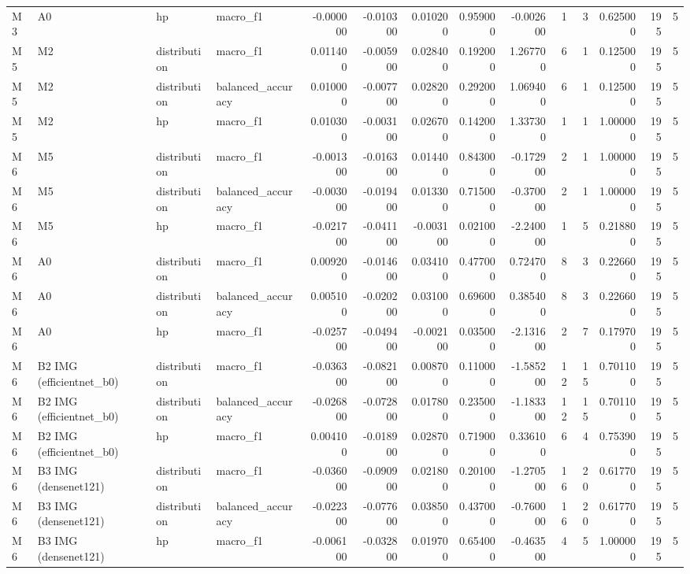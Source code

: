 \begin{table}
\begin{tabular}{llllrrrrrrrrrr}
M3 & A0 & hp & macro\_f1 & -0.000000 & -0.010300 & 0.010200 & 0.959000 & -0.002600 & 1 & 3 & 0.625000 & 195 & 5 \\
M5 & M2 & distribution & macro\_f1 & 0.011400 & -0.005900 & 0.028400 & 0.192000 & 1.267700 & 6 & 1 & 0.125000 & 195 & 5 \\
M5 & M2 & distribution & balanced\_accuracy & 0.010000 & -0.007700 & 0.028200 & 0.292000 & 1.069400 & 6 & 1 & 0.125000 & 195 & 5 \\
M5 & M2 & hp & macro\_f1 & 0.010300 & -0.003100 & 0.026700 & 0.142000 & 1.337300 & 1 & 1 & 1.000000 & 195 & 5 \\
M6 & M5 & distribution & macro\_f1 & -0.001300 & -0.016300 & 0.014400 & 0.843000 & -0.172900 & 2 & 1 & 1.000000 & 195 & 5 \\
M6 & M5 & distribution & balanced\_accuracy & -0.003000 & -0.019400 & 0.013300 & 0.715000 & -0.370000 & 2 & 1 & 1.000000 & 195 & 5 \\
M6 & M5 & hp & macro\_f1 & -0.021700 & -0.041100 & -0.003100 & 0.021000 & -2.240000 & 1 & 5 & 0.218800 & 195 & 5 \\
M6 & A0 & distribution & macro\_f1 & 0.009200 & -0.014600 & 0.034100 & 0.477000 & 0.724700 & 8 & 3 & 0.226600 & 195 & 5 \\
M6 & A0 & distribution & balanced\_accuracy & 0.005100 & -0.020200 & 0.031000 & 0.696000 & 0.385400 & 8 & 3 & 0.226600 & 195 & 5 \\
M6 & A0 & hp & macro\_f1 & -0.025700 & -0.049400 & -0.002100 & 0.035000 & -2.131600 & 2 & 7 & 0.179700 & 195 & 5 \\
M6 & B2 IMG (efficientnet\_b0) & distribution & macro\_f1 & -0.036300 & -0.082100 & 0.008700 & 0.110000 & -1.585200 & 12 & 15 & 0.701100 & 195 & 5 \\
M6 & B2 IMG (efficientnet\_b0) & distribution & balanced\_accuracy & -0.026800 & -0.072800 & 0.017800 & 0.235000 & -1.183300 & 12 & 15 & 0.701100 & 195 & 5 \\
M6 & B2 IMG (efficientnet\_b0) & hp & macro\_f1 & 0.004100 & -0.018900 & 0.028700 & 0.719000 & 0.336100 & 6 & 4 & 0.753900 & 195 & 5 \\
M6 & B3 IMG (densenet121) & distribution & macro\_f1 & -0.036000 & -0.090900 & 0.021800 & 0.201000 & -1.270500 & 16 & 20 & 0.617700 & 195 & 5 \\
M6 & B3 IMG (densenet121) & distribution & balanced\_accuracy & -0.022300 & -0.077600 & 0.038500 & 0.437000 & -0.760000 & 16 & 20 & 0.617700 & 195 & 5 \\
M6 & B3 IMG (densenet121) & hp & macro\_f1 & -0.006100 & -0.032800 & 0.019700 & 0.654000 & -0.463500 & 4 & 5 & 1.000000 & 195 & 5 \\

\end{tabular}
\end{table}
